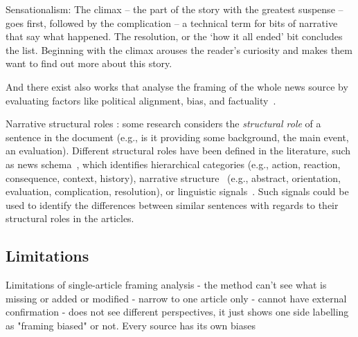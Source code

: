 Sensationalism:
The climax – the part of the story with the greatest suspense – goes first, followed by the complication – a technical term for bits of narrative that say what happened. The resolution, or the ‘how it all ended’ bit concludes the list. Beginning with the climax arouses  the reader’s curiosity and makes them want to find out more about this story.



And there exist also works that analyse the framing of the whole news source by evaluating factors like political alignment, bias, and factuality~\cite{yin2008truth}.



Narrative structural roles
\cite{zahid2019towards}:
some research considers the \emph{structural role} of a sentence in the document (e.g., is it providing some background, the main event, an evaluation).
Different structural roles have been defined in the literature, such as 
news schema~\cite{bell1991language}, which identifies hierarchical categories (e.g., action, reaction, consequence, context, history), narrative structure~\cite{bell2005news} (e.g., abstract, orientation, evaluation, complication, resolution), or linguistic signals~\cite{zahid2019towards,marcu2000theory}. 
Such signals could be used to identify the differences between similar sentences with regards to their structural roles in the articles. 

\subsection{Limitations}
\label{ssec:lit_framing_limit}

Limitations of single-article framing analysis
- the method can't see what is missing or added or modified
- narrow to one article only
- cannot have external confirmation
- does not see different perspectives, it just shows one side labelling as "framing biased" or not. Every source has its own biases





